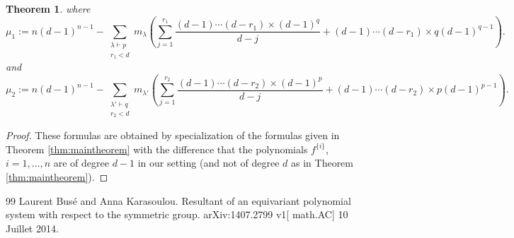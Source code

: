 \documentclass[10pt,a4paper]{amsart}
\newtheorem{theorem}{Theorem}
\begin{document}
\begin{theorem}
where
 \begin{equation*}
    \mu_1:=n(d-1)^{n-1}-\sum_{ \substack{\lambda\vdash p \\ r_1 < d}} m_{\lambda} 
   \left(\sum_{j=1}^{r_1}\dfrac{(d-1)\cdots(d-r_1)\times (d-1)^q}{d-j}+(d-1)\cdots(d-r_1)\times q(d-1)^{q-1} \right).
   \end{equation*}
   and
 \begin{equation*}
    \mu_2:=n(d-1)^{n-1}-\sum_{ \substack{\lambda'\vdash q \\ r_2 < d}} m_{\lambda'} 
   \left(\sum_{j=1}^{r_2}\dfrac{(d-1)\cdots(d-r_2)\times (d-1)^p}{d-j}+(d-1)\cdots(d-r_2)\times p(d-1)^{p-1} \right).
   \end{equation*}
\end{theorem}

\begin{proof}
These formulas are obtained by specialization of the formulas given in Theorem \ref{thm:maintheorem} with the difference that the polynomials $f^{\{i\}}$, $i=1,\ldots,n$ are of degree $d-1$ in our setting (and not of degree $d$ as in Theorem \ref{thm:maintheorem}).
\end{proof}

\begin{thebibliography}{99}
 Laurent Bus{\'e} and Anna Karasoulou. Resultant of an equivariant polynomial system with respect to the symmetric group. arXiv:1407.2799 v1[ math.AC] 10 Juillet 2014.
\end{thebibliography}
\end{document}
